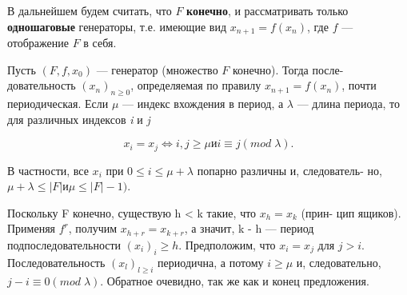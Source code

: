 
\noindent В дальнейшем будем считать, что $F$ \textbf{конечно}, и рассматривать только \linebreak \textbf{одношаговые} генераторы, т.е. имеющие вид $x_{n+1} = f(x_{n})$, где $f$ --- \linebreak отображение $F$ в себя. \par 
\begin{predl}
Пусть $(F,f,x_{0})$ --- генератор (множество $F$ конечно). Тогда после- \linebreak довательность $(x_{n})_{n \geqslant 0}$, определяемая по правилу $x_{n+1} = f(x_{n})$, почти \linebreak периодическая. Если $\mu$ --- индекс вхождения в период, а $\lambda$ --- длина \linebreak периода, то для различных индексов \textit{i} и \textit{j} \par

$$x_{i}=x_{j} \Longleftrightarrow \textit{i},\textit{j} \geqslant \mu и \textit{i}\equiv\textit{j} (mod \; \lambda).$$ \par 
\noindent В частности, все $x_{\textit{i}}$ при $0 \leqslant\textit{i} \leq \mu + \lambda$ попарно различны и, следователь- \linebreak но, $\mu + \lambda \leqslant|F| и \mu \leqslant|F| - 1)$. \par 
\end{predl}
\begin{myproof}
Поскольку F конечно, существую h < k такие, что $x_{h} = x_{k}$ (прин- \linebreak \indent цип ящиков). Применяя $f^{r}$, получим $x_{h+r} = x_{k+r}$, а значит, k - h --- \linebreak \indent период подпоследовательности $(x_{i})_{i}\geqslant h$. Предположим, что $x_{i} = x_{j}$ \linebreak \indent  для $j > i$. Последовательность $(x_{l})_{l \geqslant i}$ периодична, а потому $i \geqslant \mu$ и, \linebreak \indent следовательно, $j - i \equiv 0 (mod \; \lambda)$. Обратное очевидно, так же как и \linebreak \indent конец предложения. \par 
\end{myproof}
\begin{figure}[h]
\end{figure}

